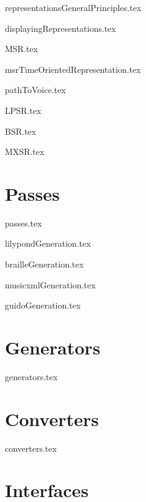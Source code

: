 \documentclass[11pt,a4paper]{report}
\begin{document}
{representationsGeneralPrinciples.tex}

{displayingRepresentations.tex}

{MSR.tex}

{msrTimeOrientedRepresentation.tex}

{pathToVoice.tex}

{LPSR.tex}

{BSR.tex}

{MXSR.tex}


\part{Passes}

{passes.tex}

{lilypondGeneration.tex}

{brailleGeneration.tex}

{musicxmlGeneration.tex}

{guidoGeneration.tex}


\part{Generators}

{generators.tex}


\part{Converters}

{converters.tex}


\part{Interfaces}
\end{document}
